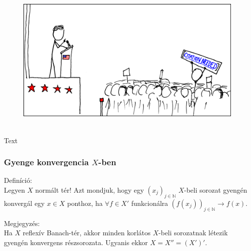 \documentclass[12pt,a4paper]{scrartcl}
\newenvironment{definicio}{}{}
\newenvironment{megjegyzes}{}{}
\newenvironment{ajanlofig}{\begin{figure}\begin{center}}{
\end{center}\end{figure}}
\begin{document}
\begin{ajanlo}

\begin{ajanlofig}

\href{https://xkcd.com}{\includegraphics[width=5.20833in,height=2.82292in]{wikipedian_protester.png}}

\end{ajanlofig}

Text

\end{ajanlo}

\hypertarget{gyenge-konvergencia-x-ben}{%
\subsubsection{\texorpdfstring{Gyenge konvergencia
\(X\)-ben}{Gyenge konvergencia X-ben}}\label{gyenge-konvergencia-x-ben}}

\begin{definicio}

Definíció:\\
Legyen \(X\) normált tér! Azt mondjuk, hogy egy
\(\left( x_{j} \right)_{j \in {\mathbb{N}}}\) \(X\)-beli sorozat gyengén
konvergál egy \(x \in X\) ponthoz, ha \(\forall f \in X'\) funkcionálra
\(\left. \left( {f\left( x_{j} \right)} \right)_{j \in {\mathbb{N}}}\rightarrow f\left( x \right) \right.\).

\end{definicio}

\begin{megjegyzes}

Megjegyzés:\\
Ha \(X\) reflexív Banach-tér, akkor minden korlátos \(X\)-beli
sorozatnak létezik gyengén konvergens részsorozata. Ugyanis ekkor
\(X = X'' = \left( {X'} \right)'\).

\end{megjegyzes}
\end{document}
